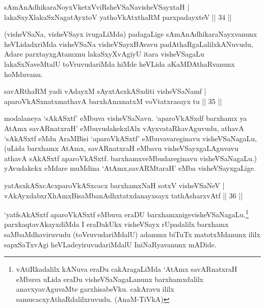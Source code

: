 
\begin{shl}
sAmAnAdhikaraNoyxVketxVviRsheVSaNavisheVSayxtaH |\\
lakaSxyXlakaSxNagatAyx\s toV yathoVkAtxthaRM parxpadayxteV \hfill || 34 ||
\end{shl}

\begin{artha}
(visheVSaNa, visheVSayx ivugaLiMda) padagaLige sAmAnAdhikaraNayxvanunx heVLidadxriMda visheVSaNa visheVSayxBAvavu padAthaRgaLalilx\break kANuvudu, Adare parxtayxgAtamxnu lakaSxyXvAgiyU itara visheVSagaLu lakaSxNaveMtalU toVruvudariMda hiMde heVLida aKaMDAthaRvanunx hoMduvanu.
\end{artha}


\begin{shl}
savARthaRM yadi vA\s \s dayxM sAyxtAsxkASxditi visheVSaNamf |\\
aparoVkASxnatxmathavA barxhAmxnatxM voVtatxrasayx tu \hfill || 35 ||
\end{shl}

\begin{artha}
modalaneya `sAkASxtf' eMbuva visheVSaNavu. `aparoVkASxdf barxhamx ya AtAmx savARnatxraH' eMbuvudakekxlAlx vAyxvataRkavAguvudu, athavA `sAkASxtf eMdu AraMBisi `aparoVkASxtf' eMbuvavareginavu visheVSaNagaLu, (uLida barxhamx AtAmx, savARnatxraH eMbavu visheVSayxgaLAguvavu athavA sAkASxtf aparoVkASxtf. barxhamxveMbudareginavu visheVSaNagaLu.) yAvudakekx eMdare muMdina `AtAmx,\break savARMtaraH' eMba visheVSayxgaLige.
\end{artha}


\begin{shl}
yatAsxkASxcAcxparoVkASxcacx barxhamxNaH sotxV visheVSaNeV |\\
vAkAyxdabxrXhAmxBisaMbanAdhxtatxdanayxsayx tathA\s sharxvAtf \hfill || 36 ||
\end{shl}

\begin{artha}
`yatfsAkASxtf aparoVkASxtf eMbuva eraDU barxhamxnige\break visheVSaNagaLu.\footnote{vAtiRkadalilx kANuva eraDu cakAragaLiMda `AtAmx savARnatxraH eMbuva uLida eraDu visheVSaNagaLanunx barxhamxdalilx anavxyavAguvaMte garxhisabeVku. cakAravu ililx samucacxyAthaRdalilxruvudu. (AnaM-TiVkA)} parxkaqtavAkayxdiMda I eraDakUkx visheVSayx rUpadalilx barxhamx saMbaMdhaviruvudu (toVruvudariMdalU) adanunx biTuTx matotxMdanunx ililx sapxSaTxvAgi heVLadeyiruvudariMdalU I\break niNaRyavanunx mADide.
\end{artha}

